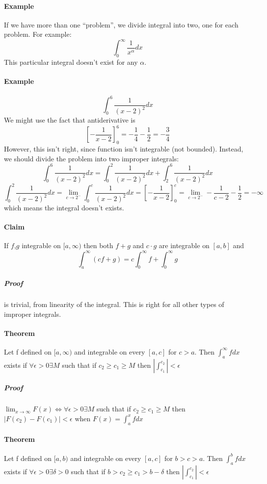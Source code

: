 \paragraph{Example}
If we have more than one ``problem'', we divide integral into two, one for each problem. For example:
$$\int_0^\infty \frac{1}{x^\alpha} dx$$
This particular integral doesn't exist for any $\alpha$.
\paragraph{Example}
$$\int_0^6 \frac{1}{\left(x-2\right)^2}dx$$
We might use the fact that antiderivative is $$\left[-\frac{1}{x-2}\right]_0^6 = -\frac{1}{4}-\frac{1}{2}=-\frac{3}{4}$$
However, this isn't right, since function isn't integrable (not bounded). Instead, we should divide the problem into two improper integrals:
$$\int_0^6  \frac{1}{\left(x-2\right)^2}dx = \int_0^2  \frac{1}{\left(x-2\right)^2}dx + \int_2^6  \frac{1}{\left(x-2\right)^2}dx$$
$$\int_0^2  \frac{1}{\left(x-2\right)^2}dx  = \lim_{c \to 2^-}\int_0^c  \frac{1}{\left(x-2\right)^2}dx = \left[-\frac{1}{x-2}\right]_0^c =  \lim_{c \to 2^-} -\frac{1}{c-2} - \frac{1}{2} = -\infty$$
which means the integral doesn't exists.
\paragraph{Claim}
If $f$,$g$ integrable on $[a,\infty)$ then both $f+g$ and $c\cdot g$ are integrable on $[a,b]$ and
$$\int_a^\infty (cf+g) = c\int_0^\infty f + \int_0^\infty g$$
\subparagraph{Proof} is trivial, from linearity of the integral. This is right for all other types of improper integrals.
\paragraph{Theorem} Let f defined on $[a, \infty)$ and integrable on every $[a,c]$ for $c>a$. Then $\int_a^\infty f dx$ exists if $\forall \epsilon > 0 \exists M$ such that if $c_2\geq c_1 \geq M$ then $\left| \int_{c_1}^{c_2} \right| < \epsilon$
\subparagraph{Proof} $\lim_{x\to \infty} F(x) \iff \forall \epsilon > 0  \exists M$ such that if $c_2\geq c_1 \geq M$ then $\left| F(c_2)-F(c_1) \right| < \epsilon$ when $F(x) = \int_a^x f dx$ 
\paragraph{Theorem} Let f defined on $[a, b)$ and integrable on every $[a,c]$ for $b>c>a$. Then $\int_a^b f dx$ exists if $\forall \epsilon > 0 \exists \delta > 0$ such that if $b>c_2\geq c_1 > b -\delta$ then $\left| \int_{c_1}^{c_2} \right| < \epsilon$
